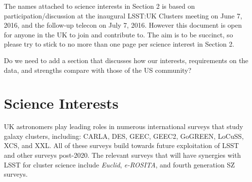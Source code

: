 \documentclass[a4paper,11pt]{article}
\begin{document}
The names attached to science interests in Section 2 is based on
participation/discussion at the inaugural LSST:UK Clusters meeting on
June 7, 2016, and the follow-up telecon on July 7, 2016.  However this
document is open for anyone in the UK to join and contribute to.  The
aim is to be succinct, so please try to stick to no more than one page
per science interest in Section 2.

Do we need to add a section that discusses how our interests,
requirements on the data, and strengths compare with those of the US
community?

\section{Science Interests}\label{sec:interests}

UK astronomers play leading roles in numerous international surveys
that study galaxy clusters, including: CARLA, DES, GEEC, GEEC2,
GoGREEN, LoCuSS, XCS, and XXL.  All of these surveys build towards
future exploitation of LSST and other surveys post-2020.  The relevant
surveys that will have synergies with LSST for cluster science include
\emph{Euclid}, \emph{e-ROSITA}, and fourth generation SZ surveys.
\end{document}

